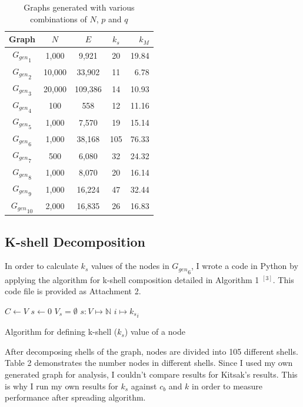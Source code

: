 \documentclass[11pt,a4,twocolumn]{article}
\begin{document}
\begin{table} [h]
\begin{tabular}{|c|c|c|c|r|}
\hline
Graph & $N$ & $E$ & $k_{s}$ & $k_{M}$ \\
\hline
${G_{gen}}_1$ & 1,000 & 9,921 & 20& 19.84 \\
${G_{gen}}_2$  & 10,000 & 33,902 & 11 & 6.78 \\
${G_{gen}}_3$  & 20,000 & 109,386 & 14 &10.93 \\
${G_{gen}}_4$  & 100 & 558 & 12 &11.16 \\
${G_{gen}}_5$  & 1,000 & 7,570 & 19 &15.14 \\
${G_{gen}}_6$  & 1,000 & 38,168 & 105 &76.33 \\
${G_{gen}}_7$  & 500 & 6,080 & 32 &24.32 \\
${G_{gen}}_8$  & 1,000 & 8,070 & 20 &16.14 \\
${G_{gen}}_9$  & 1,000 & 16,224 & 47 &32.44 \\
${G_{gen}}_{10}$  & 2,000 & 16,835 & 26 &16.83 \\

\hline
\end{tabular}
\caption{Graphs generated with various combinations of $N$, $p$ and $q$}
\end{table}

\subsection{K-shell Decomposition}

In order to calculate $k_{s}$ values of the nodes in ${G_{gen}}_6$, I wrote a code in Python by applying the algorithm for k-shell composition detailed in Algorithm 1 $^{[3]}$. This code file is provided as Attachment 2. 

\begin{algorithm}
\SetAlgoLined
{}
 $C\gets V$\;
 $s\gets 0$\;
 $V_{s} = \emptyset$ \;
$s:V \mapsto \mathbb{N}$ \;
$i \mapsto {k_{s}}_i$\;
 \caption{Algorithm for defining k-shell ($k_{s}$) value of a node}
\end{algorithm}

After decomposing shells of the graph, nodes are divided into 105 different shells. Table 2 demonstrates the number nodes in different shells. Since I used my own generated graph for analysis, I couldn't compare results for Kitsak's results. This is why I run my own results for $k_{s}$ against $c_{b}$ and $k$ in order to measure performance after spreading algorithm.
\end{document}
